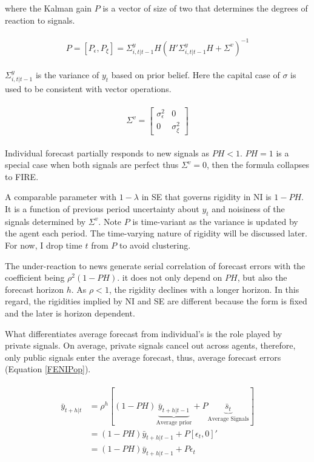 \documentclass[12pt]{article}
\begin{document}
	where the Kalman gain $P$ is a vector of size of two that determines the degrees of reaction to signals. 
	
	
	\begin{eqnarray}
		\begin{aligned}
			P = [P_\epsilon,P_\xi]= \Sigma^y_{i,t|t-1} H(H'\Sigma^y_{i,t|t-1} H + \Sigma^v)^{-1} 
		\end{aligned}
	\end{eqnarray}
	
	$\Sigma^y_{i,t|t-1}$  is the variance of  $y_t$ based on prior belief. Here the capital case of $\sigma$ is used to be consistent with vector operations. 
	
	\begin{eqnarray}
		\begin{aligned}
			\Sigma^v =  \left[ \begin{matrix} 
				\sigma^2_{\epsilon} &  0 \\ 
				0 & \sigma^2_\xi \end{matrix}\right] 
		\end{aligned}
	\end{eqnarray}
	
	Individual forecast partially responds to new signals as  $PH<1$. $PH=1$ is a special case when both signals are perfect thus $\Sigma^v = 0$, then the formula collapses to FIRE. 
	
	
	A comparable parameter with $1-\lambda$ in SE that governs rigidity in NI is $1-PH$. It is a function of previous period uncertainty about $y_t$ and noisiness of the signals determined by $\Sigma^v$. Note $P$ is time-variant as the variance is updated by the agent each period. The time-varying nature of rigidity will be discussed later. For now, I drop time $t$ from $P$ to avoid clustering.  
	
	The under-reaction to news generate serial correlation of forecast errors with the coefficient being $\rho^2(1-PH)$. it does not only depend on $PH$, but also the forecast horizon $h$. As $\rho<1$, the rigidity declines with a longer horizon. In this regard, the rigidities implied by NI and SE are different because the form is fixed and the later is horizon dependent. 
	
	What differentiates average forecast from individual's is the role played by private signals. On average, private signals cancel out across agents, therefore, only public signals enter the average forecast, thus, average forecast errors (Equation \ref{FENIPop}). 
	
	\begin{eqnarray}\label{FENIPop}
		\begin{aligned}
			\bar y_{t+h|t} & = \rho^h [(1-PH) \underbrace{\bar  y_{t+h|t-1}}_{\text{Average prior}} + P \underbrace{\bar s_{t}}_{\text{Average Signals}}] \\
			& = (1-PH) \bar y_{t+h|t-1}+ P [\epsilon_t, 0]' \\
			& = (1-PH) \bar y_{t+h|t-1} + P \epsilon_t
		\end{aligned}
	\end{eqnarray}
	
\end{document}
